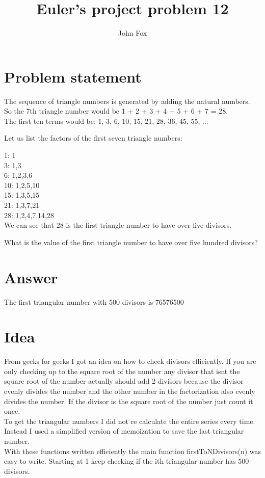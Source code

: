 \documentclass{article}
\title{Euler's project problem 12}
\author{John Fox}
\begin{document}
\maketitle

\section*{Problem statement} 
The sequence of triangle numbers is generated by adding the natural numbers. \\
So the 7th triangle number would be 1 + 2 + 3 + 4 + 5 + 6 + 7 = 28. \\
The first ten terms would be: 1, 3, 6, 10, 15, 21, 28, 36, 45, 55, ...

Let us list the factors of the first seven triangle numbers:

 1: 1\\
 3: 1,3\\
 6: 1,2,3,6\\
10: 1,2,5,10\\
15: 1,3,5,15\\
21: 1,3,7,21\\
28: 1,2,4,7,14,28\\
We can see that 28 is the first triangle number to have over five divisors.

What is the value of the first triangle number to have over five hundred divisors?

\section*{Answer}
The first triangular number with 500 divisors is 76576500
\section*{Idea} From geeks for geeks I got an idea on how to check divisors efficiently. If you are only checking up to the square root of the number any divisor that isnt the square root of the number actually should add 2 divisors because the divisor evenly divides the number and the other number in the factorization also evenly divides the number. If the divisor is the square root of the number just count it once.\\
To get the triangular numbers I did not re calculate the entire series every time. Instead I used a simplified version of memoization to save the last triangular number. \\
With these functions written efficiently the main function firstToNDivisors(n) was easy to write. Starting at 1 keep checking if the ith triangular number has 500 divisors.
 
\end{document}
